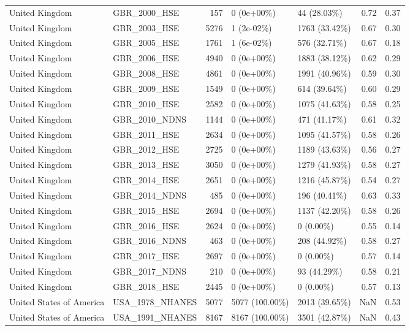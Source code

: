 \begin{longtable}{llrllrr}
United Kingdom & GBR\_2000\_HSE & 157 & 0 (0e+00\%) & 44 (28.03\%) & 0.72 & 0.37\\
United Kingdom & GBR\_2003\_HSE & 5276 & 1 (2e-02\%) & 1763 (33.42\%) & 0.67 & 0.30\\
United Kingdom & GBR\_2005\_HSE & 1761 & 1 (6e-02\%) & 576 (32.71\%) & 0.67 & 0.18\\
United Kingdom & GBR\_2006\_HSE & 4940 & 0 (0e+00\%) & 1883 (38.12\%) & 0.62 & 0.29\\
United Kingdom & GBR\_2008\_HSE & 4861 & 0 (0e+00\%) & 1991 (40.96\%) & 0.59 & 0.30\\
United Kingdom & GBR\_2009\_HSE & 1549 & 0 (0e+00\%) & 614 (39.64\%) & 0.60 & 0.29\\
United Kingdom & GBR\_2010\_HSE & 2582 & 0 (0e+00\%) & 1075 (41.63\%) & 0.58 & 0.25\\
United Kingdom & GBR\_2010\_NDNS & 1144 & 0 (0e+00\%) & 471 (41.17\%) & 0.61 & 0.32\\
United Kingdom & GBR\_2011\_HSE & 2634 & 0 (0e+00\%) & 1095 (41.57\%) & 0.58 & 0.26\\
United Kingdom & GBR\_2012\_HSE & 2725 & 0 (0e+00\%) & 1189 (43.63\%) & 0.56 & 0.27\\
United Kingdom & GBR\_2013\_HSE & 3050 & 0 (0e+00\%) & 1279 (41.93\%) & 0.58 & 0.27\\
United Kingdom & GBR\_2014\_HSE & 2651 & 0 (0e+00\%) & 1216 (45.87\%) & 0.54 & 0.27\\
United Kingdom & GBR\_2014\_NDNS & 485 & 0 (0e+00\%) & 196 (40.41\%) & 0.63 & 0.33\\
United Kingdom & GBR\_2015\_HSE & 2694 & 0 (0e+00\%) & 1137 (42.20\%) & 0.58 & 0.26\\
United Kingdom & GBR\_2016\_HSE & 2624 & 0 (0e+00\%) & 0 (0.00\%) & 0.55 & 0.14\\
United Kingdom & GBR\_2016\_NDNS & 463 & 0 (0e+00\%) & 208 (44.92\%) & 0.58 & 0.27\\
United Kingdom & GBR\_2017\_HSE & 2697 & 0 (0e+00\%) & 0 (0.00\%) & 0.57 & 0.14\\
United Kingdom & GBR\_2017\_NDNS & 210 & 0 (0e+00\%) & 93 (44.29\%) & 0.58 & 0.21\\
United Kingdom & GBR\_2018\_HSE & 2445 & 0 (0e+00\%) & 0 (0.00\%) & 0.57 & 0.13\\
\addlinespace
United States of America & USA\_1978\_NHANES & 5077 & 5077 (100.00\%) & 2013 (39.65\%) & NaN & 0.53\\
United States of America & USA\_1991\_NHANES & 8167 & 8167 (100.00\%) & 3501 (42.87\%) & NaN & 0.43\\

\end{longtable}
